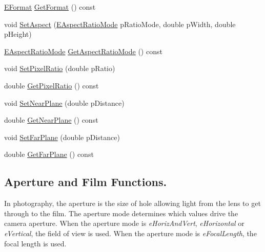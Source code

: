 \begin{DoxyCompactItemize}
\hyperlink{class_fbx_camera_a88d68c983d21e4d6c0f281a8a30f0a06}{E\+Format} \hyperlink{class_fbx_camera_a068be46bd59bcaa398565fcff992d18f}{Get\+Format} () const
\item 
void \hyperlink{class_fbx_camera_adb9cf67e4b59463add6a052003797392}{Set\+Aspect} (\hyperlink{class_fbx_camera_a2135478bb5fd6985835c14b11e1fccda}{E\+Aspect\+Ratio\+Mode} p\+Ratio\+Mode, double p\+Width, double p\+Height)
\item 
\hyperlink{class_fbx_camera_a2135478bb5fd6985835c14b11e1fccda}{E\+Aspect\+Ratio\+Mode} \hyperlink{class_fbx_camera_ad60e1323bdb9f349dbb96e5d8bdf716a}{Get\+Aspect\+Ratio\+Mode} () const
\item 
void \hyperlink{class_fbx_camera_a55058f98c5bdaed70ad02c9062804798}{Set\+Pixel\+Ratio} (double p\+Ratio)
\item 
double \hyperlink{class_fbx_camera_ae12fca0cd15518d611dbe26f2b6babbf}{Get\+Pixel\+Ratio} () const
\item 
void \hyperlink{class_fbx_camera_a4ceb2775d2392c380cd8529d78f98c7f}{Set\+Near\+Plane} (double p\+Distance)
\item 
double \hyperlink{class_fbx_camera_ae4c1364cd162c51ad539cf3f6fc1fbe6}{Get\+Near\+Plane} () const
\item 
void \hyperlink{class_fbx_camera_a23f2f8bba739049a5e0ea55213085787}{Set\+Far\+Plane} (double p\+Distance)
\item 
double \hyperlink{class_fbx_camera_a07b8a3633669335c8adde9049574d5cc}{Get\+Far\+Plane} () const
\end{DoxyCompactItemize}
\subsection*{Aperture and Film Functions.}
\label{_amgrpf30ddd7650a62145134729ff6120789e}%
In photography, the aperture is the size of hole allowing light from the lens to get through to the film. The aperture mode determines which values drive the camera aperture. When the aperture mode is {\itshape e\+Horiz\+And\+Vert}, {\itshape e\+Horizontal} or {\itshape e\+Vertical}, the field of view is used. When the aperture mode is {\itshape e\+Focal\+Length}, the focal length is used.


